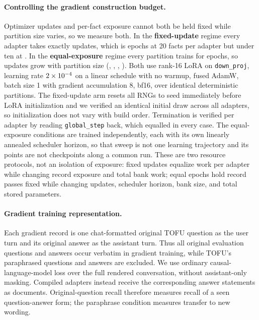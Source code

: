 \documentclass{article}
\begin{document}
\paragraph{Controlling the gradient construction budget.} Optimizer updates and
per-fact exposure cannot both be held fixed while partition size varies, so we
measure both. In the \textbf{fixed-update} regime every adapter takes exactly
\SeedSteps{} updates, which is \ExpEpochs{} epochs at 20 facts per adapter but
under ten at \NPerArm{}. In the \textbf{equal-exposure} regime every partition
trains for \ExpEpochs{} epochs, so updates grow with partition size
(\ExpGTwentySteps{}, \ExpGFortySteps{}, \ExpGHundredSteps{},
\ExpGTwoHundredSteps{}). Both use rank-16 LoRA on \texttt{down\_proj}, learning
rate $2\times10^{-4}{}$ on a linear schedule with no warmup, fused AdamW, batch
size 1 with gradient accumulation 8, bf16, over identical deterministic
partitions. The fixed-update arm resets all RNGs to seed \SeedSeed{} immediately
before LoRA initialization and we verified an identical initial draw across all
\SeedNAd{} adapters, so initialization does not vary with build order.
Termination is verified per adapter by reading \texttt{global\_step} back, which
equalled \SeedSteps{} in every case. The equal-exposure conditions are trained
independently, each with its own linearly annealed scheduler horizon, so that
sweep is not one learning trajectory and its points are not checkpoints along a
common run. These are two resource protocols, not an isolation of exposure:
fixed updates equalize work per adapter while changing record exposure and total
bank work; equal epochs hold record passes fixed while changing updates,
scheduler horizon, bank size, and total stored parameters.

\paragraph{Gradient training representation.} Each gradient record is one
chat-formatted original TOFU question as the user turn and its original answer
as the assistant turn. Thus all original evaluation questions and answers occur
verbatim in gradient training, while TOFU's paraphrased questions and answers
are excluded. We use ordinary causal-language-model loss over the full rendered
conversation, without assistant-only masking. Compiled adapters instead receive
the corresponding answer statements as documents. Original-question recall
therefore measures recall of a seen question-answer form; the paraphrase
condition measures transfer to new wording.
\end{document}

